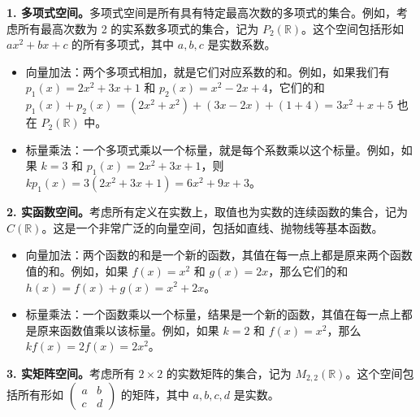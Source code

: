 \textbf{1. 多项式空间。}多项式空间是所有具有特定最高次数的多项式的集合。例如，考虑所有最高次数为 2 的实系数多项式的集合，记为 \(P_2(\mathbb{R})\)。这个空间包括形如 \(ax^2 + bx + c\) 的所有多项式，其中 \(a, b, c\) 是实数系数。

\begin{itemize}
    \item 向量加法：两个多项式相加，就是它们对应系数的和。例如，如果我们有 \(p_1(x) = 2x^2 + 3x + 1\) 和 \(p_2(x) = x^2 - 2x + 4\)，它们的和 \(p_1(x) + p_2(x) = (2x^2 + x^2) + (3x - 2x) + (1 + 4) = 3x^2 + x + 5\) 也在 \(P_2(\mathbb{R})\) 中。
    \item 标量乘法：一个多项式乘以一个标量，就是每个系数乘以这个标量。例如，如果 \(k = 3\) 和 \(p_1(x) = 2x^2 + 3x + 1\)，则 \(kp_1(x) = 3(2x^2 + 3x + 1) = 6x^2 + 9x + 3\)。
\end{itemize}

\textbf{2. 实函数空间。}考虑所有定义在实数上，取值也为实数的连续函数的集合，记为 \(C(\mathbb{R})\)。这是一个非常广泛的向量空间，包括如直线、抛物线等基本函数。

\begin{itemize}
    \item 向量加法：两个函数的和是一个新的函数，其值在每一点上都是原来两个函数值的和。例如，如果 \(f(x) = x^2\) 和 \(g(x) = 2x\)，那么它们的和 \(h(x) = f(x) + g(x) = x^2 + 2x\)。
    \item 标量乘法：一个函数乘以一个标量，结果是一个新的函数，其值在每一点上都是原来函数值乘以该标量。例如，如果 \(k = 2\) 和 \(f(x) = x^2\)，那么 \(kf(x) = 2f(x) = 2x^2\)。
\end{itemize}

\textbf{3. 实矩阵空间。}考虑所有 \(2 \times 2\) 的实数矩阵的集合，记为 \(M_{2,2}(\mathbb{R})\)。这个空间包括所有形如 \(\begin{pmatrix} a & b \\ c & d \end{pmatrix}\) 的矩阵，其中 \(a, b, c, d\) 是实数。

